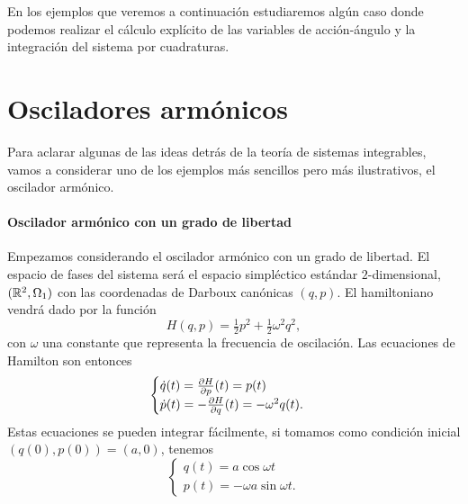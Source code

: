 En los ejemplos que veremos a continuación estudiaremos algún caso donde podemos realizar el cálculo explícito de las variables de acción-ángulo y la integración del sistema por cuadraturas.

\section{Osciladores armónicos}
Para aclarar algunas de las ideas detrás de la teoría de sistemas integrables, vamos a considerar uno de los ejemplos más sencillos pero más ilustrativos, el oscilador armónico.

\paragraph{\bf Oscilador armónico con un grado de libertad}\mbox{}

  Empezamos considerando el oscilador armónico con un grado de libertad. El espacio de fases del sistema será el espacio simpléctico estándar $2$-dimensional, $(\mathbb{R}^2,\Omega_1)$ con las coordenadas de Darboux canónicas $(q,p)$. El hamiltoniano vendrá dado por la función
  \begin{equation*}
    H(q,p)=\tfrac{1}{2}p^2+\tfrac{1}{2}\omega^2 q^2,
  \end{equation*}
  con $\omega$ una constante que representa la frecuencia de oscilación.
  Las ecuaciones de Hamilton son entonces
  \begin{equation*}
    \begin{cases}
      \dot q(t) = \frac{\partial H}{\partial p}(t)=p(t)\\
    \dot p(t) = -\frac{\partial H}{\partial q}(t)=-\omega^2q(t).
  \end{cases}
  \end{equation*}
  Estas ecuaciones se pueden integrar fácilmente, si tomamos como condición inicial $(q(0),p(0))=(a,0)$, tenemos
  \begin{equation*}
    \begin{cases}
   q(t)=a\cos\omega t \\ 
   p(t)=-\omega a\sin\omega t.
 \end{cases}
  \end{equation*}
  
